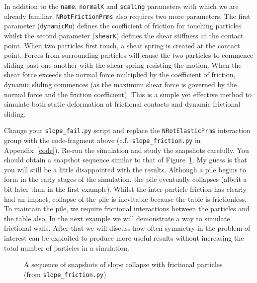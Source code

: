 \noindent
In addition to the \texttt{name}, \texttt{normalK} and \texttt{scaling} parameters with which we are already familiar, \texttt{NRot\+Fric\+tionPrms} also requires two more parameters. The first parameter (\texttt{dynamicMu}) defines the coefficient of friction for touching particles whilst the second parameter (\texttt{shearK}) defines the shear stiffness at the contact point. When two particles first touch, a shear spring is created at the contact point. Forces from surrounding particles will cause the two particles to commence sliding past one-another with the shear spring resisting the motion. When the shear force exceeds the normal force multiplied by the coefficient of friction, dynamic sliding commences (as the maximum shear force is governed by the normal force and the friction coefficient). This is a simple yet effective method to simulate both static deformation at frictional contacts and dynamic frictional sliding. 

Change your \texttt{slope\_fail.py} script and replace the \texttt{NRotElasticPrms} interaction group with the code-fragment above (c.f.\ \texttt{slope\_friction.py} in Appendix~\ref{code}). Re-run the simulation and study the snapshots carefully. You should obtain a snapshot sequence similar to that of Figure~\ref{fig:slope_friction_pics}. My guess is that you will still be a little disappointed with the results. Although a pile begins to form in the early stages of the simulation, the pile eventually collapses (albeit a bit later than in the first example). Whilst the inter-particle friction has clearly had an impact, collapse of the pile is inevitable because the table is frictionless. To maintain the pile, we require frictional interactions between the particles and the table also. In the next example we will demonstrate a way to simulate frictional walls. After that we will discuss how often symmetry in the problem of interest can be exploited to produce more useful results without increasing the total 
number of particles in a simulation.

\begin{figure}
\caption{A sequence of snapshots of slope collapse with frictional particles (from \texttt{slope\_\+fric\+tion.py})} \label{fig:slope_friction_pics}
\end{figure}

